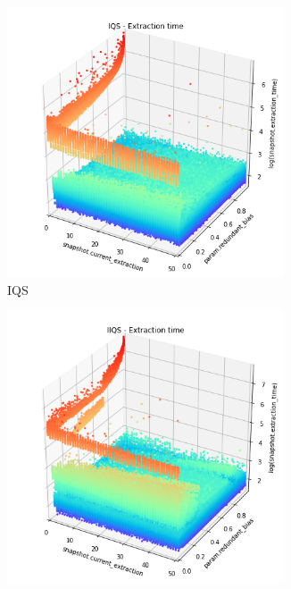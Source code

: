\begin{figure}
    \centering
    \begin{subfigure}[b]{0.45\textwidth}
        \centering
        \includegraphics[width=0.9\textwidth]{./fragments/04_experimental_execution/images/01_basebenchmark_07_extraction_bias.png.1_0.png}
        \caption{IQS}
        \label{FIG:BENCHMARK_07_NOISE_BIAS__0_0}
    \end{subfigure}
    \hfill
    \begin{subfigure}[b]{0.45\textwidth}
        \centering
        \includegraphics[width=0.9\textwidth]{./fragments/04_experimental_execution/images/01_basebenchmark_07_extraction_bias.png.0_0.png}

\end{subfigure}
\end{figure}
